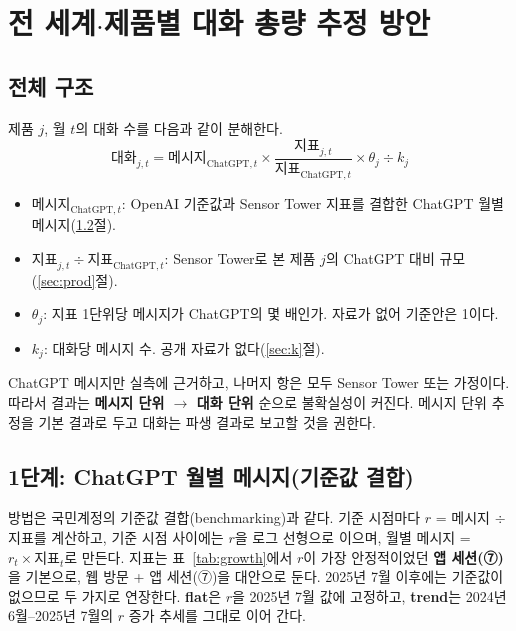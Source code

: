 \documentclass[11pt]{article}
\begin{document}
\section{전 세계$\cdot$제품별 대화 총량 추정 방안}

\subsection{전체 구조}

제품 $j$, 월 $t$의 대화 수를 다음과 같이 분해한다.
\begin{equation*}
\text{대화}_{j,t} = \text{메시지}_{\text{ChatGPT},t} \times \frac{\text{지표}_{j,t}}{\text{지표}_{\text{ChatGPT},t}} \times \theta_j \div k_j
\end{equation*}
\begin{itemize}
  \item $\text{메시지}_{\text{ChatGPT},t}$: OpenAI 기준값과 Sensor Tower 지표를 결합한 ChatGPT 월별 메시지(\ref{sec:bench}절).
  \item $\text{지표}_{j,t} \div \text{지표}_{\text{ChatGPT},t}$: Sensor Tower로 본 제품 $j$의 ChatGPT 대비 규모(\ref{sec:prod}절).
  \item $\theta_j$: 지표 1단위당 메시지가 ChatGPT의 몇 배인가. 자료가 없어 기준안은 1이다.
  \item $k_j$: 대화당 메시지 수. 공개 자료가 없다(\ref{sec:k}절).
\end{itemize}
ChatGPT 메시지만 실측에 근거하고, 나머지 항은 모두 Sensor Tower 또는 가정이다. 따라서 결과는 \textbf{메시지 단위 $\to$ 대화 단위} 순으로 불확실성이 커진다. 메시지 단위 추정을 기본 결과로 두고 대화는 파생 결과로 보고할 것을 권한다.

\subsection{1단계: ChatGPT 월별 메시지(기준값 결합)}\label{sec:bench}

방법은 국민계정의 기준값 결합(benchmarking)과 같다. 기준 시점마다 $r$ = 메시지 $\div$ 지표를 계산하고, 기준 시점 사이에는 $r$을 로그 선형으로 이으며, 월별 메시지 = $r_t \times \text{지표}_t$로 만든다. 지표는 표~\ref{tab:growth}에서 $r$이 가장 안정적이었던 \textbf{앱 세션(⑦)}을 기본으로, 웹 방문 + 앱 세션(⑦)을 대안으로 둔다. 2025년 7월 이후에는 기준값이 없으므로 두 가지로 연장한다. \textbf{flat}은 $r$을 2025년 7월 값에 고정하고, \textbf{trend}는 2024년 6월--2025년 7월의 $r$ 증가 추세를 그대로 이어 간다.
\end{document}
